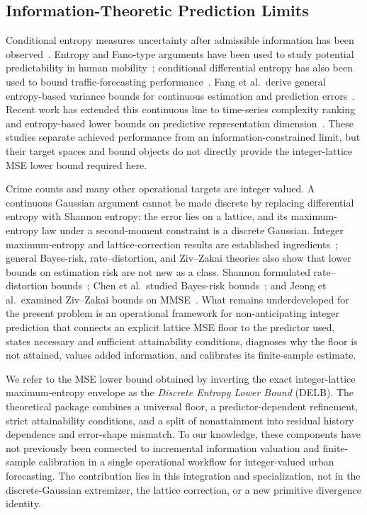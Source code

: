 \documentclass[applsci,article,accept,moreauthors]{Definitions/mdpi}
\begin{document}
\subsection{Information-Theoretic Prediction Limits}
\label{subsec:related_information_limits}

Conditional entropy measures uncertainty after admissible information has
been observed~\citep{shannon1948,cover_thomas}. Entropy and Fano-type
arguments have been used to study potential predictability in human mobility~\citep{song2010limits}; conditional differential entropy has also been used to
bound traffic-forecasting performance~\citep{li2022traffic}. Fang et al.\
derive general entropy-based variance bounds for continuous estimation and
prediction errors~\citep{fang_variance_bounds}. Recent work has extended this
continuous line to time-series complexity ranking and entropy-based lower
bounds on predictive representation dimension~\citep{ayers2025complexity,hauser2026dmd}. These studies separate achieved
performance from an information-constrained limit, but their target spaces
and bound objects do not directly provide the integer-lattice MSE lower bound
required here.

Crime counts and many other operational targets are integer valued. A
continuous Gaussian argument cannot be made discrete by replacing
differential entropy with Shannon entropy: the error lies on a lattice, and
its maximum-entropy law under a second-moment constraint is a discrete
Gaussian. Integer maximum-entropy and lattice-correction results are
established ingredients~\citep{massey_integer_entropy,rioul_massey}; general
Bayes-risk, rate--distortion, and Ziv--Zakai theories also show that lower
bounds on estimation risk are not new as a class. {Shannon formulated
rate--distortion bounds~\citep{shannon_rate_distortion}; Chen et al.\ studied
Bayes-risk bounds~\citep{chen_bayes_risk}; and Jeong et al.\ examined
Ziv--Zakai bounds on MMSE~\citep{jeong_ziv_zakai}.} What remains
underdeveloped for the present problem is an operational framework for
non-anticipating integer prediction that connects an explicit lattice MSE
floor to the predictor used, states necessary and sufficient attainability
conditions, diagnoses why the floor is not attained, values added
information, and calibrates its finite-sample estimate.

We refer to the MSE lower bound obtained by inverting the exact integer-lattice
maximum-entropy envelope as the \emph{Discrete Entropy Lower Bound} (DELB).
The theoretical package combines a universal floor, a predictor-dependent
refinement, strict attainability conditions, and a split of nonattainment
into residual history dependence and error-shape mismatch. To our knowledge,
these components have not previously been connected to incremental
information valuation and finite-sample calibration in a single operational
workflow for integer-valued urban forecasting. The contribution lies in this
integration and specialization, not in the discrete-Gaussian extremizer, the
lattice correction, or a new primitive divergence identity.
\end{document}

